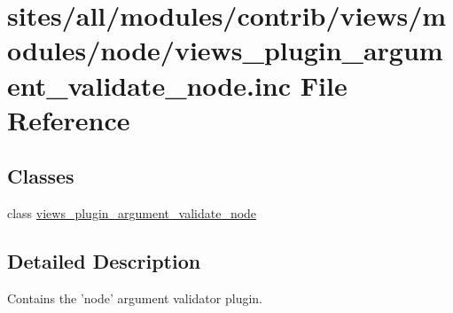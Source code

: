 \hypertarget{views__plugin__argument__validate__node_8inc}{
\section{sites/all/modules/contrib/views/modules/node/views\_\-plugin\_\-argument\_\-validate\_\-node.inc File Reference}
\label{views__plugin__argument__validate__node_8inc}
}
\subsection*{Classes}
\begin{CompactItemize}
\item 
class \hyperlink{classviews__plugin__argument__validate__node}{views\_\-plugin\_\-argument\_\-validate\_\-node}
\end{CompactItemize}


\subsection{Detailed Description}
Contains the 'node' argument validator plugin. 